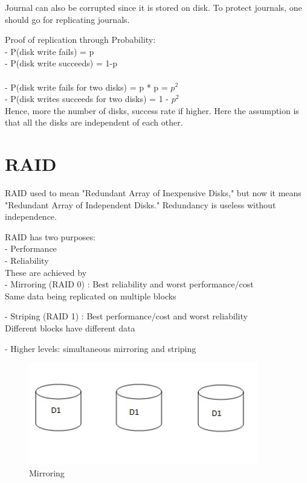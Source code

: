 \documentclass[twoside]{article}
\begin{document}
Journal can also be corrupted since it is stored on disk. To protect journals, one should go for replicating journals.

Proof of replication through Probability:\\
- P(disk write fails) = p\\
- P(disk write succeeds) = 1-p\\
\\
- P(disk write fails for two disks) = p * p =  $p^2$ \\
- P(disk writes succeeds for two disks) = 1 - $p^2$\\
Hence, more the number of disks, success rate if higher. Here the assumption is that all the disks are independent of each other.


\section{RAID}

RAID used to mean "Redundant Array of Inexpensive Disks," but now it means "Redundant Array of Independent Disks." Redundancy is useless without independence.

RAID has two purposes: \\
- Performance \\
- Reliability \\

These are achieved by \\
-  Mirroring (RAID 0) : Best reliability and worst performance/cost \\
 Same data being replicated on multiple blocks 
  
- Striping (RAID 1) : Best performance/cost and worst reliability \\
  Different blocks have different data 

- Higher levels: simultaneous mirroring and striping \\

\begin{figure}[ht!]
\center
\includegraphics[width=100mm]{Mirroring.jpg}
\caption{ Mirroring \label{Mirroring diagram}}
\end{figure}
\end{document}
